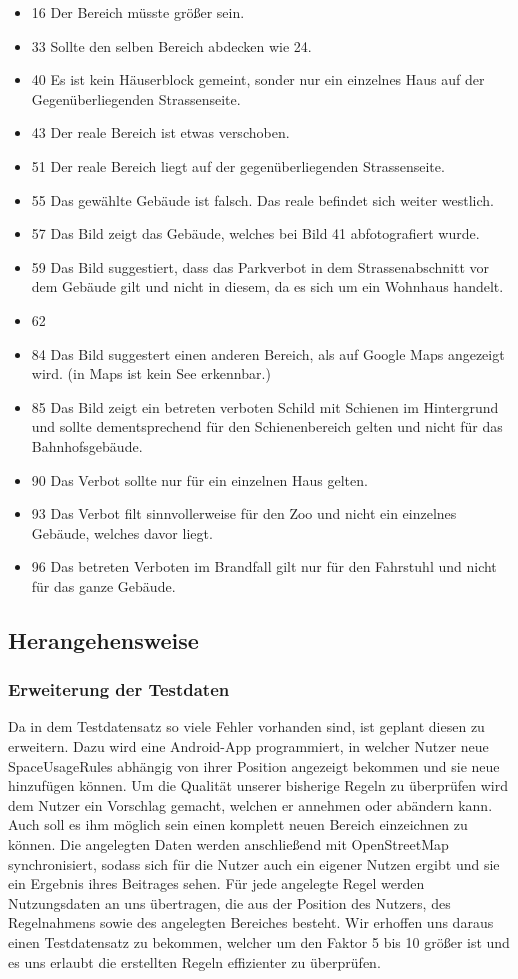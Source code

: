 \begin{itemize}
\item 16 Der Bereich müsste größer sein.
\item 33 Sollte den selben Bereich abdecken wie 24.
\item 40 Es ist kein Häuserblock gemeint, sonder nur ein einzelnes Haus auf der Gegenüberliegenden Strassenseite.
\item 43 Der reale Bereich ist etwas verschoben.
\item 51 Der reale Bereich liegt auf der gegenüberliegenden Strassenseite.
\item 55 Das gewählte Gebäude ist falsch. Das reale befindet sich weiter westlich.
\item 57 Das Bild zeigt das Gebäude, welches bei Bild 41 abfotografiert wurde.
\item 59 Das Bild suggestiert, dass das Parkverbot in dem Strassenabschnitt vor dem Gebäude gilt und nicht in diesem, da es sich um ein Wohnhaus handelt.
\item 62
\item 84 Das Bild suggestert einen anderen Bereich, als auf Google Maps angezeigt wird. (in Maps ist kein See erkennbar.)
\item 85 Das Bild zeigt ein betreten verboten Schild mit Schienen im Hintergrund und sollte dementsprechend für den Schienenbereich gelten und nicht für das Bahnhofsgebäude.
\item 90 Das Verbot sollte nur für ein einzelnen Haus gelten.
\item 93 Das Verbot filt sinnvollerweise für den Zoo und nicht ein einzelnes Gebäude, welches davor liegt.
\item 96 Das betreten Verboten im Brandfall gilt nur für den Fahrstuhl und nicht für das ganze Gebäude.
\end{itemize}

\subsection{Herangehensweise}
\subsubsection{Erweiterung der Testdaten}
Da in dem Testdatensatz so viele Fehler vorhanden sind, ist geplant diesen zu erweitern. Dazu wird eine Android-App programmiert, in welcher Nutzer neue SpaceUsageRules
abhängig von ihrer Position angezeigt bekommen und sie neue hinzufügen können.
Um die Qualität unserer bisherige Regeln zu überprüfen wird dem Nutzer ein Vorschlag gemacht, welchen er annehmen oder abändern kann. Auch soll es ihm möglich sein
einen komplett neuen Bereich einzeichnen zu können.
Die angelegten Daten werden anschließend mit OpenStreetMap synchronisiert, sodass sich für die Nutzer auch ein eigener Nutzen ergibt und sie ein Ergebnis ihres Beitrages sehen.
Für jede angelegte Regel werden Nutzungsdaten an uns übertragen, die aus der Position des Nutzers, des Regelnahmens sowie des angelegten Bereiches besteht.
Wir erhoffen uns daraus einen Testdatensatz zu bekommen, welcher um den Faktor 5 bis 10 größer ist und es uns erlaubt die erstellten Regeln effizienter zu überprüfen.

